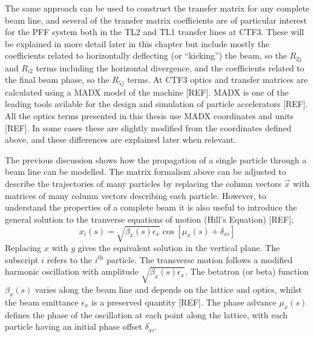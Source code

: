The same approach can be used to construct the transfer matrix for any complete beam line, and several of the transfer matrix coefficients are of particular interest for the PFF system both in the TL2 and TL1 transfer lines at CTF3. These will be explained in more detail later in this chapter but include mostly the coefficients related to horizontally deflecting (or ``kicking'') the beam, so the \(R_{2j}\) and \(R_{i2}\) terms including the horizontal divergence, and the coefficients related to the final beam phase, so the \(R_{5j}\) terms. At CTF3 optics and transfer matrices are calculated using a MADX model of the machine [REF]. MADX is one of the leading tools avilable for the design and simulation of particle accelerators [REF]. All the optics terms presented in this thesis use MADX coordinates and units [REF]. In some cases these are slightly modified from the coordinates defined above, and these differences are explained later when relevant.

The previous discussion shows how the propagation of a single particle through a beam line can be modelled. The matrix formalism above can be adjusted to describe the trajectories of many particles by replacing the column vectors \(\vec{x}\) with matrices of many column vectors describing each particle. However, to understand the properties of a complete beam it is also useful to introduce the general solution to the tranverse equations of motion (Hill's Equation) [REF]:
\begin{equation}
x_i(s) = \sqrt{\beta_x(s)\epsilon_x}\cos[\mu_x(s) + \delta_{xi}]
\end{equation}
Replacing \(x\) with \(y\) gives the equivalent solution in the vertical plane. The subscript \(i\) refers to the \(i^\mathrm{th}\) particle. The transverse motion follows a modified harmonic oscillation with amplitude \(\sqrt{\beta_x(s)\epsilon_x}\). The betatron (or beta) function \(\beta_x(s)\) varies along the beam line and depends on the lattice and optics, whilst the beam emittance \(\epsilon_x\) is a preserved quantity [REF]. The phase advance \(\mu_x(s)\) defines the phase of the oscillation at each point along the lattice, with each particle having an initial phase offset \(\delta_{xi}\).

